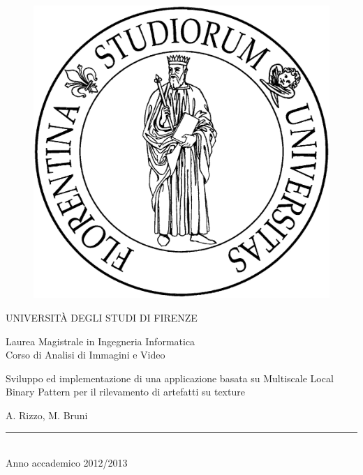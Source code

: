 \documentclass[a4paper,10pt]{article}
\begin{document}

\begin{titlepage}
\thispagestyle{empty}
\topmargin=1cm
\large

\begin{figure}[ht]
\centering
\includegraphics[scale=0.075]{img/Stemma.jpg}
\end{figure}

\begin{center}

UNIVERSITÀ DEGLI STUDI DI FIRENZE
\vspace{0.5cm}

Laurea Magistrale in Ingegneria Informatica
\\
\normalsize
Corso di Analisi di Immagini e Video
\vspace{4cm}

\begin{huge}
Sviluppo ed implementazione di una applicazione basata su Multiscale Local Binary Pattern per il rilevamento di artefatti su texture
\end{huge}

\vspace{0.5cm}

A. Rizzo, M. Bruni

\vspace{4.5cm}
\rule{4cm}{.4pt}
\\
Anno accademico 2012/2013
\end{center}
\end{titlepage}
\end{document}
